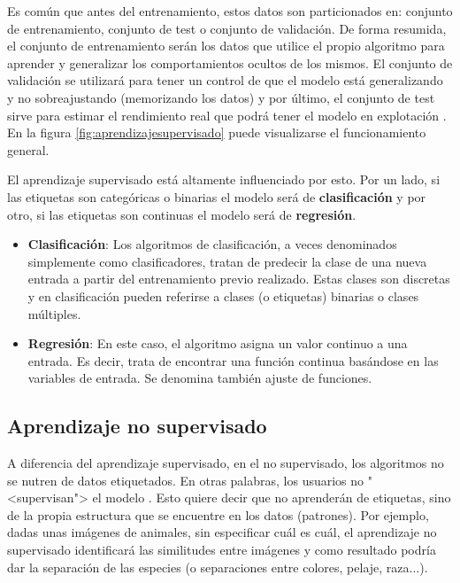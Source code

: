 Es común que antes del entrenamiento, estos datos son particionados en: conjunto de
entrenamiento, conjunto de test o conjunto de validación. De forma resumida, el
conjunto de entrenamiento serán los datos que utilice el propio algoritmo para
aprender y generalizar los comportamientos ocultos de los mismos. El conjunto de
validación se utilizará para tener un control de que el modelo está
generalizando y no sobreajustando (memorizando los datos) y por último, el
conjunto de test sirve para estimar el rendimiento real que podrá tener el
modelo en explotación \cite{enwiki:conjuntos}. En la figura
\ref{fig:aprendizajesupervisado} puede visualizarse el funcionamiento general.


El aprendizaje supervisado está altamente influenciado por esto. Por un lado, si
las etiquetas son categóricas o binarias el modelo será de
\textbf{clasificación} y por otro, si las etiquetas son continuas el modelo será
de \textbf{regresión}.

\begin{itemize}
    \item \textbf{Clasificación}: Los algoritmos de clasificación, a veces
    denominados simplemente como clasificadores, tratan de predecir la clase de
    una nueva entrada a partir del entrenamiento previo realizado. Estas clases
    son discretas y en clasificación pueden referirse a clases (o etiquetas)
    binarias o clases múltiples.
    
    \item \textbf{Regresión}: En este caso, el algoritmo asigna un valor
    continuo a una entrada. Es decir, trata de encontrar una función continua
    basándose en las variables de entrada. Se denomina también ajuste de
    funciones.
\end{itemize}

\clearpage

\subsection{Aprendizaje no supervisado}

A diferencia del aprendizaje supervisado, en el no supervisado, los algoritmos
no se nutren de datos etiquetados. En otras palabras, los usuarios no "<supervisan"> el modelo
\cite{salim:usl}. Esto quiere decir que no aprenderán de etiquetas, sino de la
propia estructura que se encuentre en los datos (patrones). Por ejemplo, dadas
unas imágenes de animales, sin especificar cuál es cuál, el aprendizaje no
supervisado identificará las similitudes entre imágenes y como resultado podría
dar la separación de las especies (o separaciones entre colores, pelaje,
raza...).

